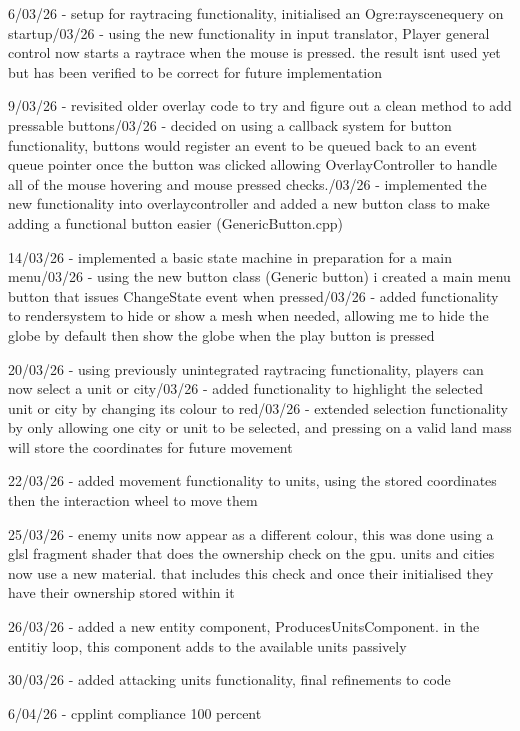 \documentclass[]{final_report}
\begin{document}
6/03/26 - setup for raytracing functionality, initialised an Ogre:rayscenequery on startup/03/26 - using the new functionality in input translator, Player general control now starts a raytrace when the mouse is pressed. the result isnt used yet but has been verified to be correct for future implementation\newline

9/03/26 - revisited older overlay code to try and figure out a clean method to add pressable buttons/03/26 - decided on using a callback system for button functionality, buttons would register an event to be queued back to an event queue pointer once the button was clicked allowing OverlayController to handle all of the mouse hovering and mouse pressed checks./03/26 - implemented the new functionality into overlaycontroller and added a new button class to make adding a functional button easier (GenericButton.cpp)\newline

14/03/26 - implemented a basic state machine in preparation for a main menu/03/26 - using the new button class (Generic button) i created a main menu button that issues ChangeState event when pressed/03/26 - added functionality to rendersystem to hide or show a mesh when needed, allowing me to hide the globe by default then show the globe when the play button is pressed\newline

20/03/26 - using previously unintegrated raytracing functionality, players can now select a unit or city/03/26 - added functionality to highlight the selected unit or city by changing its colour to red/03/26 - extended selection functionality by only allowing one city or unit to be selected, and pressing on a valid land mass will store the coordinates for future movement\newline

22/03/26 - added movement functionality to units, using the stored coordinates then the interaction wheel to move them\newline

25/03/26 - enemy units now appear as a different colour, this was done using a glsl fragment shader that does the ownership check on the gpu. units and cities now use a new material.  that includes this check and once their initialised they have their ownership stored within it\newline

26/03/26 - added a new entity component, ProducesUnitsComponent. in the entitiy loop, this component adds to the available units passively\newline

30/03/26 - added attacking units functionality, final refinements to code\newline

6/04/26 - cpplint compliance 100 percent \newline
\end{document}
